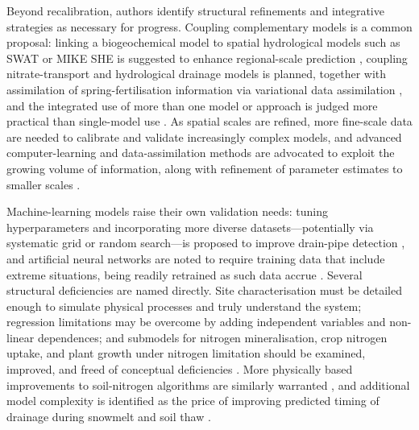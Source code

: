 \documentclass[11pt]{article}
\begin{document}
Beyond recalibration, authors identify structural refinements and integrative strategies as necessary for progress. Coupling complementary models is a common proposal: linking a biogeochemical model to spatial hydrological models such as SWAT or MIKE SHE is suggested to enhance regional-scale prediction \parencite{Li2006}, coupling nitrate-transport and hydrological drainage models is planned, together with assimilation of spring-fertilisation information via variational data assimilation \parencite{Chelil2022}, and the integrated use of more than one model or approach is judged more practical than single-model use \parencite{Singh2019b}. As spatial scales are refined, more fine-scale data are needed to calibrate and validate increasingly complex models, and advanced computer-learning and data-assimilation methods are advocated to exploit the growing volume of information, along with refinement of parameter estimates to smaller scales \parencite{Apostel2021}.

Machine-learning models raise their own validation needs: tuning hyperparameters and incorporating more diverse datasets---potentially via systematic grid or random search---is proposed to improve drain-pipe detection \parencite{Song2021}, and artificial neural networks are noted to require training data that include extreme situations, being readily retrained as such data accrue \parencite{Yang2000}. Several structural deficiencies are named directly. Site characterisation must be detailed enough to simulate physical processes and truly understand the system; regression limitations may be overcome by adding independent variables and non-linear dependences; and submodels for nitrogen mineralisation, crop nitrogen uptake, and plant growth under nitrogen limitation should be examined, improved, and freed of conceptual deficiencies \parencite{Ahuja2007}. More physically based improvements to soil-nitrogen algorithms are similarly warranted \parencite{Ikenberry2017}, and additional model complexity is identified as the price of improving predicted timing of drainage during snowmelt and soil thaw \parencite{Feyereisen2007}.
\end{document}
